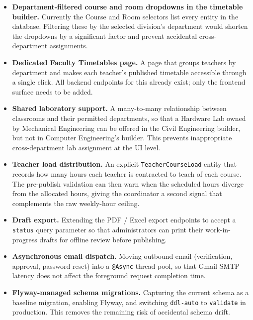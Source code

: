 \begin{itemize}
    \item \textbf{Department-filtered course and room dropdowns in the timetable builder.} Currently the Course and Room selectors list every entity in the database. Filtering these by the selected division's department would shorten the dropdowns by a significant factor and prevent accidental cross-department assignments.

    \item \textbf{Dedicated Faculty Timetables page.} A page that groups teachers by department and makes each teacher's published timetable accessible through a single click. All backend endpoints for this already exist; only the frontend surface needs to be added.

    \item \textbf{Shared laboratory support.} A many-to-many relationship between classrooms and their permitted departments, so that a Hardware Lab owned by Mechanical Engineering can be offered in the Civil Engineering builder, but not in Computer Engineering's builder. This prevents inappropriate cross-department lab assignment at the UI level.

    \item \textbf{Teacher load distribution.} An explicit \texttt{TeacherCourseLoad} entity that records how many hours each teacher is contracted to teach of each course. The pre-publish validation can then warn when the scheduled hours diverge from the allocated hours, giving the coordinator a second signal that complements the raw weekly-hour ceiling.

    \item \textbf{Draft export.} Extending the PDF / Excel export endpoints to accept a \texttt{status} query parameter so that administrators can print their work-in-progress drafts for offline review before publishing.

    \item \textbf{Asynchronous email dispatch.} Moving outbound email (verification, approval, password reset) into a \texttt{@Async} thread pool, so that Gmail SMTP latency does not affect the foreground request completion time.

    \item \textbf{Flyway-managed schema migrations.} Capturing the current schema as a baseline migration, enabling Flyway, and switching \texttt{ddl-auto} to \texttt{validate} in production. This removes the remaining risk of accidental schema drift.
\end{itemize}

